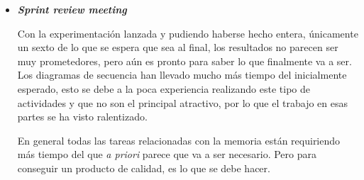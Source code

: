 \begin{itemize}
\item \textbf{\textit{Sprint review meeting}}

Con la experimentación lanzada y pudiendo haberse hecho entera, únicamente un sexto de lo que se espera que sea al final, los resultados no parecen ser muy prometedores, pero aún es pronto para saber lo que finalmente va a ser.\\

Los diagramas de secuencia han llevado mucho más tiempo del inicialmente esperado, esto se debe a la poca experiencia realizando este tipo de actividades y que no son el principal atractivo, por lo que el trabajo en esas partes se ha visto ralentizado.

En general todas las tareas relacionadas con la memoria están requiriendo más tiempo del que \textit{a priori} parece que va a ser necesario. Pero para conseguir un producto de calidad, es lo que se debe hacer.

\end{itemize}

